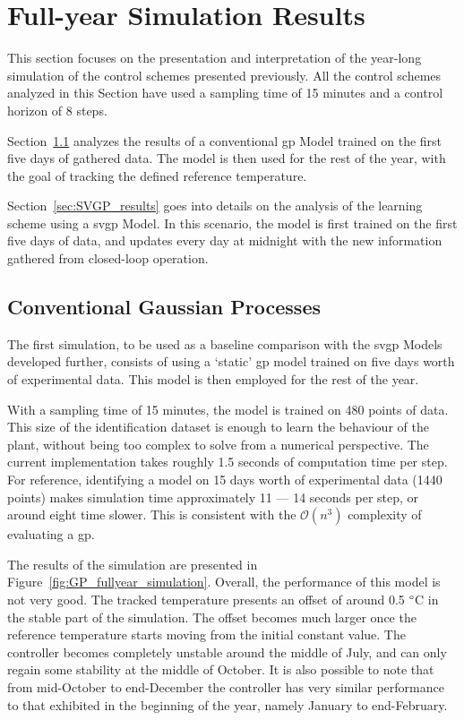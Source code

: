 \section{Full-year Simulation Results}\label{sec:results}


This section focuses on the presentation and interpretation of the year-long
simulation of the control schemes presented previously. All the control schemes
analyzed in this Section have used a sampling time of 15 minutes and a control
horizon of 8 steps.

Section~\ref{sec:GP_results} analyzes the results of a conventional
\acrshort{gp} Model trained on the first five days of gathered data. The model
is then used for the rest of the year, with the goal of tracking the defined
reference temperature.

Section~\ref{sec:SVGP_results} goes into details on the analysis of the learning
scheme using a \acrshort{svgp} Model. In this scenario, the model is first
trained on the first five days of data, and updates every day at midnight with
the new information gathered from closed-loop operation.

\subsection{Conventional Gaussian Processes}\label{sec:GP_results}

The first simulation, to be used as a baseline comparison with the
\acrshort{svgp} Models developed further, consists of using a `static'
\acrshort{gp} model trained on five days worth of experimental data. This model
is then employed for the rest of the year.

With a sampling time of 15 minutes, the model is trained on 480 points of data.
This size of the identification dataset is enough to learn the behaviour of the
plant, without being too complex to solve from a numerical perspective. The
current implementation takes roughly 1.5 seconds of computation time per step.
For reference, identifying a model on 15 days worth of experimental data (1440
points) makes simulation time approximately 11 --- 14 seconds per step, or
around eight time slower. This is consistent with the $\mathcal{O}(n^3)$
complexity of evaluating a \acrshort{gp}.

The results of the simulation are presented in
Figure~\ref{fig:GP_fullyear_simulation}. Overall, the performance of this model
is not very good. The tracked temperature presents an offset of around 0.5
$\degree$C in the stable part of the simulation. The offset becomes much larger
once the reference temperature starts moving from the initial constant value.
The controller becomes completely unstable around the middle of July, and can
only regain some stability at the middle of October. It is also possible to note
that from mid-October to end-December the controller has very similar
performance to that exhibited in the beginning of the year, namely January to
end-February.

